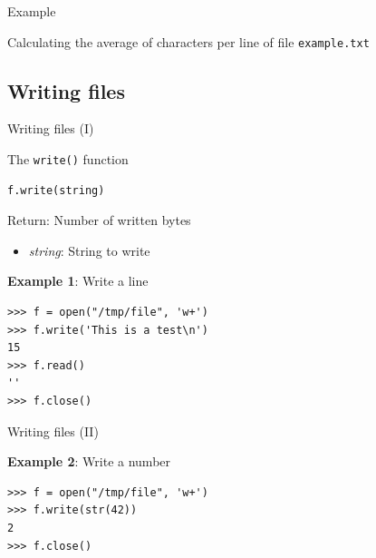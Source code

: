 \documentclass[10pt,compress]{beamer} %
\begin{document}
\begin{frame}[fragile]{Example}{}
	\begin{exampleblock}{Calculating the average of characters per line of file \texttt{example.txt}}
	\vspace{-0.2cm}
	
	\vspace{-0.2cm}
	\end{exampleblock}
\end{frame}

\subsection{Writing files}

\begin{frame}[fragile]{Writing files (I)}
	\begin{block}{The \texttt{write()} function}
	\vspace{-0.2cm}
\begin{verbatim}
f.write(string)
\end{verbatim}

	\vspace{-0.2cm}
	Return: Number of written bytes
	\begin{itemize}
	\item \textit{string}: String to write
	\end{itemize}
	\end{block}

	\textbf{Example 1}: Write a line
	\begin{verbatim}
>>> f = open("/tmp/file", 'w+')
>>> f.write('This is a test\n')
15
>>> f.read()
'' 
>>> f.close()
\end{verbatim}

\end{frame}

\begin{frame}[fragile]{Writing files (II)}
	

	\textbf{Example 2}: Write a number %
\begin{verbatim}
>>> f = open("/tmp/file", 'w+')
>>> f.write(str(42))
2
>>> f.close()
\end{verbatim}
\end{frame}
\end{document}
